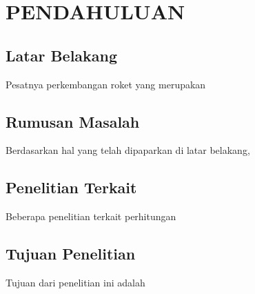 \section{PENDAHULUAN}

\subsection{Latar Belakang}

Pesatnya perkembangan roket yang merupakan \lipsum[2]

\lipsum[3]

\subsection{Rumusan Masalah}

Berdasarkan hal yang telah dipaparkan di latar belakang, \lipsum[4]

\subsection{Penelitian Terkait}

Beberapa penelitian terkait perhitungan \lipsum[5]

\lipsum[6]

\subsection{Tujuan Penelitian}

Tujuan dari penelitian ini adalah \lipsum[7][1-14]
